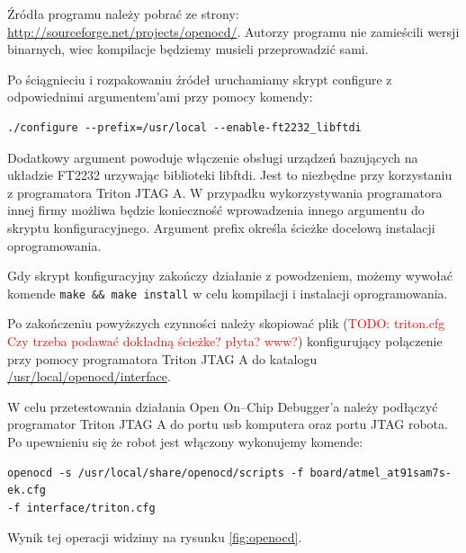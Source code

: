 Źródła programu należy pobrać ze strony: \url{http://sourceforge.net/projects/openocd/}. Autorzy programu nie zamieścili wersji binarnych, wiec kompilacje będziemy musieli przeprowadzić sami.

Po ściągnieciu i rozpakowaniu źródeł uruchamiamy skrypt configure z odpowiednimi argumentem'ami przy pomocy komendy: 

\begin{verbatim}
./configure --prefix=/usr/local --enable-ft2232_libftdi 
\end{verbatim}

Dodatkowy argument powoduje włączenie obsługi urządzeń bazujących na układzie FT2232 urzywając biblioteki libftdi. Jest to niezbędne przy korzystaniu z programatora Triton JTAG A. W przypadku wykorzystywania programatora innej firmy możliwa będzie konieczność wprowadzenia innego argumentu do skryptu konfiguracyjnego. Argument prefix określa ścieżke docelową instalacji oprogramowania. 

Gdy skrypt konfiguracyjny zakończy działanie z powodzeniem, możemy wywołać komende \verb|make && make install| w celu kompilacji i instalacji oprogramowania.

Po zakończeniu powyższych czynności należy skopiować plik (\textcolor{red}{TODO: triton.cfg Czy trzeba podawać dokładną ścieżke? płyta? www?}) konfigurujący połączenie przy pomocy programatora Triton JTAG A do katalogu \url{/usr/local/openocd/interface}.

W celu przetestowania działania Open On--Chip Debugger'a należy podłączyć programator Triton JTAG A do portu usb komputera oraz portu JTAG robota. Po upewnieniu się że robot jest włączony wykonujemy komende: 

\begin{verbatim}
openocd -s /usr/local/share/openocd/scripts -f board/atmel_at91sam7s-ek.cfg
-f interface/triton.cfg 
\end{verbatim}
                                                                                                                                                                                                                                                                                                                           Wynik tej operacji widzimy na rysunku \ref{fig:openocd}.

